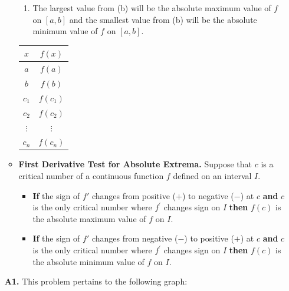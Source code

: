\documentclass[11pt]{article}
\begin{document}
\begin{enumerate}
\begin{itemize}
\begin{minipage}{0.75\textwidth}
\begin{enumerate}
\item  The largest value from (b)  will be the absolute maximum value of $f$ on $[a, b]$ and the smallest value from (b) will be the absolute minimum value of $f$ on $[a, b]$. 
\end{enumerate}
\end{minipage}
%
\hfill
%
\begin{minipage}{0.2\textwidth}
\begin{center}
\begin{tabular}{|c|c|}
\hline 
$x$ & $f(x)$\tabularnewline
\hline 
\hline 
$a$ & $f(a)$\tabularnewline
\hline 
$b$ & $f(b)$\tabularnewline
\hline 
$c_1$ & $f(c_1)$\tabularnewline
\hline 
$c_2$ & $f(c_2)$\tabularnewline
\hline 
$\vdots$ &$\vdots $\tabularnewline
\hline 
$c_n$ & $f(c_n)$\tabularnewline
\hline 
\end{tabular}
\end{center}
\end{minipage}
\vfill
\item
\textbf{First Derivative Test for Absolute Extrema.}
Suppose that $c$ is a critical number of a continuous function $f$ defined on an interval $I$.
    \begin{itemize}
    \item {\bf If} the sign of $f'$ changes from positive ($+$) to negative ($-$) at $c$ {\bf and} $c$ is the only critical number where $f^{\prime}$ changes sign on $I$
    {\bf then} $f(c)$ is the absolute maximum value of $f$ on $I$.
    \item {\bf If} the sign of $f'$ changes from negative ($-$) to positive ($+$) at $c$ {\bf and} $c$ is the only critical number where $f^{\prime}$ changes sign on $I$
    {\bf then} $f(c)$ is the absolute minimum value of $f$ on $I$.\\
    \end{itemize}
\end{itemize}
\newpage
\item[\textbf{A1.}]
This problem pertains to the following graph:


\end{enumerate}
\end{document}
